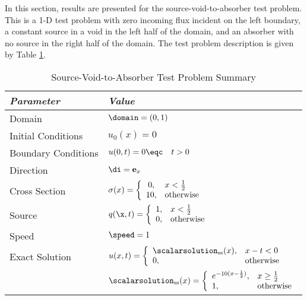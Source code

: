 In this section, results are presented for the
source-void-to-absorber test problem. This is a 1-D test problem
with zero incoming flux incident on the left boundary,
a constant source in a void in the left half of the
domain, and an absorber with no source in the right half of the
domain. The test problem description is given by Table
\ref{tab:source_void_to_absorber}.

\begin{table}[htb]\caption{Source-Void-to-Absorber Test Problem Summary}
\label{tab:source_void_to_absorber}
\centering
\begin{tabular}{l l}\toprule
\emph{Parameter} & \emph{Value}\\\midrule
Domain & $\domain = (0,1)$\\
Initial Conditions & $u_0(x)=0$\\
Boundary Conditions & $u(0,t)=0 \eqc \quad t>0$\\
Direction & $\di = \mathbf{e}_x$\\
Cross Section & $\sigma(x)=\left\{\begin{array}{c l}
   0,  & x < \frac{1}{2}\\
   10, & \mbox{otherwise}\end{array}\right.$\\
Source & $q(\x,t)=\left\{\begin{array}{c l}
   1,  & x < \frac{1}{2}\\
   0,  & \mbox{otherwise}\end{array}\right.$\\
Speed & $\speed=1$\\
Exact Solution & $u(x,t)=\left\{\begin{array}{l l}
   \scalarsolution_{\text{ss}}(x), & x-t<0\\
   0, & \mbox{otherwise}
   \end{array}\right.$ \\
   & $\scalarsolution_{\text{ss}}(x) =
       \left\{\begin{array}{l l}
          e^{-10(x-\frac{1}{2})}, & x\ge\frac{1}{2}\\
          1,                      & \mbox{otherwise}
       \end{array}\right.$\\
\bottomrule\end{tabular}
\end{table}

